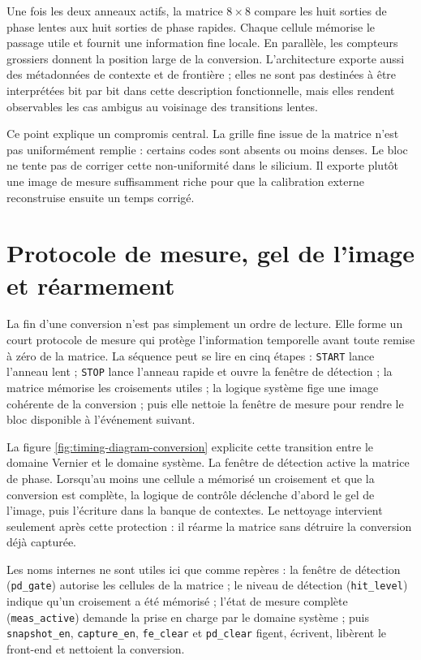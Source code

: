 Une fois les deux anneaux actifs, la matrice \mbox{$8\times8$} compare les huit sorties de phase lentes aux huit sorties de phase rapides. Chaque cellule mémorise le passage utile et fournit une information fine locale. En parallèle, les compteurs grossiers donnent la position large de la conversion. L'architecture exporte aussi des métadonnées de contexte et de frontière ; elles ne sont pas destinées à être interprétées bit par bit dans cette description fonctionnelle, mais elles rendent observables les cas ambigus au voisinage des transitions lentes.

Ce point explique un compromis central. La grille fine issue de la matrice n'est pas uniformément remplie : certains codes sont absents ou moins denses. Le bloc ne tente pas de corriger cette non-uniformité dans le silicium. Il exporte plutôt une image de mesure suffisamment riche pour que la calibration externe reconstruise ensuite un temps corrigé.

\section{Protocole de mesure, gel de l'image et réarmement}

La fin d'une conversion n'est pas simplement un ordre de lecture. Elle forme un court protocole de mesure qui protège l'information temporelle avant toute remise à zéro de la matrice. La séquence peut se lire en cinq étapes : \texttt{START} lance l'anneau lent ; \texttt{STOP} lance l'anneau rapide et ouvre la fenêtre de détection ; la matrice mémorise les croisements utiles ; la logique système fige une image cohérente de la conversion ; puis elle nettoie la fenêtre de mesure pour rendre le bloc disponible à l'événement suivant.

La figure \ref{fig:timing-diagram-conversion} explicite cette transition entre le domaine Vernier et le domaine système. La fenêtre de détection active la matrice de phase. Lorsqu'au moins une cellule a mémorisé un croisement et que la conversion est complète, la logique de contrôle déclenche d'abord le gel de l'image, puis l'écriture dans la banque de contextes. Le nettoyage intervient seulement après cette protection : il réarme la matrice sans détruire la conversion déjà capturée.

Les noms internes ne sont utiles ici que comme repères : la fenêtre de détection (\texttt{pd\_gate}) autorise les cellules de la matrice ; le niveau de détection (\texttt{hit\_level}) indique qu'un croisement a été mémorisé ; l'état de mesure complète (\texttt{meas\_active}) demande la prise en charge par le domaine système ; puis \texttt{snapshot\_en}, \texttt{capture\_en}, \texttt{fe\_clear} et \texttt{pd\_clear} figent, écrivent, libèrent le front-end et nettoient la conversion.

